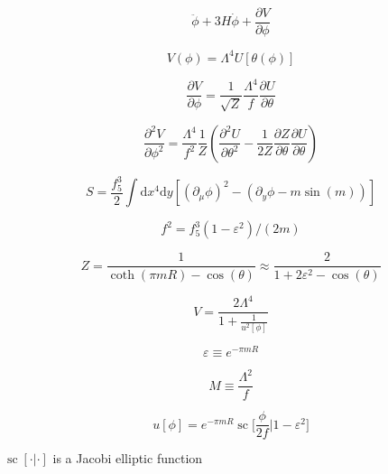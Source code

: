 \documentclass[master,       %
               twoside,        %
               BCOR10mm,       %
               english,ngerman, %
               ]{GAUBM}
\begin{document}
\begin{otherlanguage}{english}
\begin{equation}
	\ddot{\phi} + 3 H \dot{\phi} + \frac{\partial V}{\partial \phi}
\end{equation}

\begin{equation}
	V(\phi) = \Lambda^4 U[\theta(\phi)]
\end{equation}

\begin{equation}
	\frac{\partial V}{\partial \phi} = \frac{1}{\sqrt{Z}} \frac{\Lambda^4}{f} \frac{\partial U}{\partial \theta}
\end{equation}

\begin{equation}
	\frac{\partial^2 V}{\partial \phi^2} = \frac{\Lambda^4}{f^2} \frac{1}{Z} \left( \frac{\partial^2 U}{\partial \theta^2} - \frac{1}{2 Z} \frac{\partial Z}{\partial \theta} \frac{\partial U}{\partial \theta} \right)
\end{equation}

\begin{equation}
	S = \frac{f_5^3}{2} \int \mathrm{d} x^4 \mathrm{d} y \left[ (\partial_\mu \phi)^2 - (\partial_y \phi - m \sin(m)) \right]
\end{equation}

\begin{equation}
	f^2 = f_5^3 (1 - \varepsilon^2) / (2m)
\end{equation}

\begin{equation}
	Z = \frac{1}{\coth(\pi m R) - \cos(\theta)} \approx \frac{2}{1 + 2\varepsilon^2 - \cos(\theta)}
\end{equation}

\begin{equation}
	V = \frac{2 \Lambda^4}{1 + \frac{1}{u^2[\phi]}}
\end{equation}

\begin{equation}
	\varepsilon \equiv e^{- \pi m R}
\end{equation}

\begin{equation}
	M \equiv \frac{\Lambda^2}{f}
\end{equation}

\begin{equation}
	u[\phi] = e^{-\pi mR} \operatorname{sc} \big[ \frac{\phi}{2f} \big| 1 - \varepsilon^2 \big]
\end{equation}

$\operatorname{sc}[\cdot | \cdot]$ is a Jacobi elliptic function


\end{otherlanguage}
\end{document}

